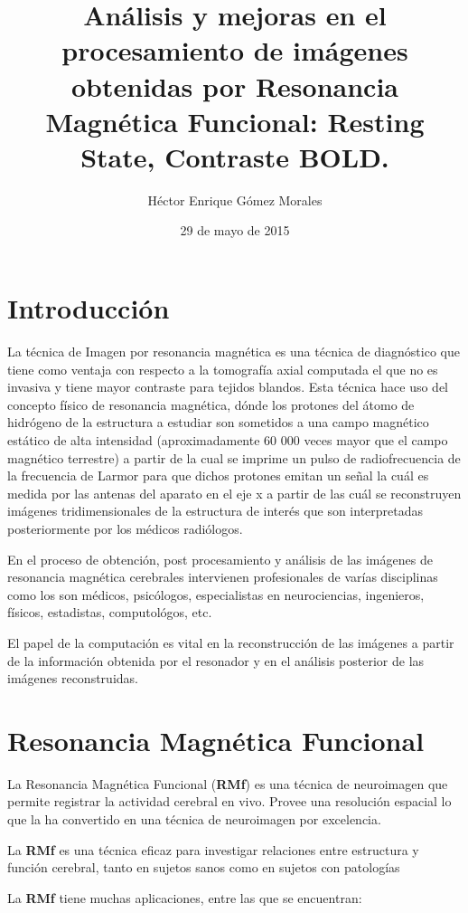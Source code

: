 \documentclass{article}
\author{Héctor Enrique Gómez Morales}
\title{Análisis y mejoras en el procesamiento de imágenes obtenidas por Resonancia Magnética Funcional: Resting State, Contraste BOLD.}
\date{29 de mayo de 2015}
\begin{document}
\section{Introducción}

La técnica de Imagen por resonancia magnética es una técnica de diagnóstico que tiene como ventaja con respecto a la tomografía axial computada el que no es invasiva y tiene mayor contraste para tejidos blandos. Esta técnica hace uso del concepto físico de resonancia magnética, dónde los protones del átomo de hidrógeno de la estructura a estudiar son sometidos a una campo magnético estático de alta intensidad (aproximadamente 60 000 veces mayor que el campo magnético terrestre) a partir de la cual se imprime un pulso de radiofrecuencia de la frecuencia de Larmor para que dichos protones emitan un señal la cuál es medida por las antenas del aparato en el eje x a partir de las cuál se reconstruyen imágenes tridimensionales de la estructura de interés que son interpretadas posteriormente por los médicos radiólogos.

En el proceso de obtención, post procesamiento y análisis de las imágenes de resonancia magnética cerebrales intervienen profesionales de varías disciplinas como los son médicos, psicólogos, especialistas en neurociencias, ingenieros, físicos, estadistas, computológos, etc.

El papel de la computación es vital en la reconstrucción de las imágenes a partir de la información obtenida por el resonador y en el análisis posterior de las imágenes reconstruidas.

\section{Resonancia Magnética Funcional}
La Resonancia Magnética Funcional (\textbf{RMf}) es una técnica de neuroimagen que permite registrar la actividad cerebral en vivo. Provee una resolución espacial lo que la ha convertido en una técnica de neuroimagen por excelencia. 

La \textbf{RMf} es una técnica eficaz para investigar relaciones entre estructura y función cerebral, tanto en sujetos sanos como en sujetos con patologías %

La \textbf{RMf} tiene muchas aplicaciones, entre las que se encuentran:
\end{document}
